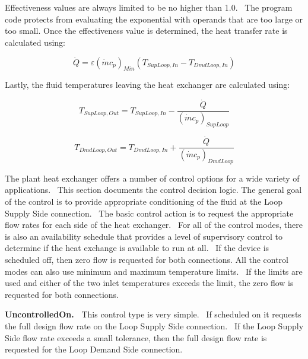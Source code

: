 Effectiveness values are always limited to be no higher than 1.0.~ The program code protects from evaluating the exponential with operands that are too large or too small. Once the effectiveness value is determined, the heat transfer rate is calculated using:

\begin{equation}
\dot Q = \varepsilon {\left( {\dot m{c_p}} \right)_{Min}}\left( {{T_{SupLoop,In}} - {T_{DmdLoop,In}}} \right)
\end{equation}

Lastly, the fluid temperatures leaving the heat exchanger are calculated using:

\begin{equation}
{T_{SupLoop,Out}} = {T_{SupLoop,In}} - \frac{{\dot Q}}{{{{\left( {\dot m{c_p}} \right)}_{SupLoop}}}}
\end{equation}

\begin{equation}
{T_{DmdLoop,Out}} = {T_{DmdLoop,In}} + \frac{{\dot Q}}{{{{\left( {\dot m{c_p}} \right)}_{DmdLoop}}}}
\end{equation}

The plant heat exchanger offers a number of control options for a wide variety of applications.~ This section documents the control decision logic. The general goal of the control is to provide appropriate conditioning of the fluid at the Loop Supply Side connection. ~The basic control action is to request the appropriate flow rates for each side of the heat exchanger.~ For all of the control modes, there is also an availability schedule that provides a level of supervisory control to determine if the heat exchange is available to run at all.~ If the device is scheduled off, then zero flow is requested for both connections. All the control modes can also use minimum and maximum temperature limits.~ If the limits are used and either of the two inlet temperatures exceeds the limit, the zero flow is requested for both connections.

\textbf{UncontrolledOn.~} This control type is very simple.~ If scheduled on it requests the full design flow rate on the Loop Supply Side connection.~ If the Loop Supply Side flow rate exceeds a small tolerance, then the full design flow rate is requested for the Loop Demand Side connection.

